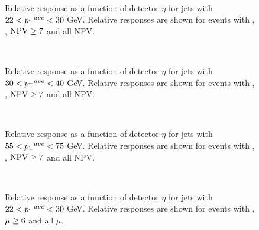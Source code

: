 \begin{figure}
\centering
\mbox{
}
\caption[Relative response as a function of $\eta$ for 3 different pileup conditions, based on NPV, for jets with $22<\ptave{}<30$ GeV]{
Relative response as a function of detector $\eta$ for jets with $22<\ptave{}<30$ GeV.
Relative responses are shown for events with , , $\rm NPV\ge7$ and all NPV. 
\label{JetPerf:PileupComp_j10}}
\end{figure}



\begin{figure}
\centering
\mbox{
}
\caption[Relative response as a function of $\eta$ for 3 different pileup conditions, based on NPV, for jets with $30<\ptave{}<40$ GeV]{
Relative response as a function of detector $\eta$ for jets with $30<\ptave{}<40$ GeV.
Relative responses are shown for events with , , $\rm NPV\ge7$ and all NPV. 
\label{JetPerf:PileupComp_j15}}
\end{figure}

\begin{figure}
\centering
\mbox{
}
\caption[Relative response as a function of $\eta$ for 3 different pileup conditions, based on NPV, for jets with $55<\ptave{}<75$ GeV]{
Relative response as a function of detector $\eta$ for jets with $55<\ptave{}<75$ GeV.
Relative responses are shown for events with , , $\rm NPV\ge7$ and all NPV. 
\label{JetPerf:PileupComp_j20}}
\end{figure}

\begin{figure}
\centering
\mbox{
}
\caption[Relative response as a function of $\eta$ for 2 different pileup conditions, based on $\mu{}$, for jets with $22<\ptave{}<30$ GeV]{
Relative response as a function of detector $\eta$ for jets with $22<\ptave{}<30$ GeV.
Relative responses are shown for events with , $\rm \mu\ge6$ and all $\mu$. 
\label{JetPerf:MuComp_j10}}
\end{figure}



